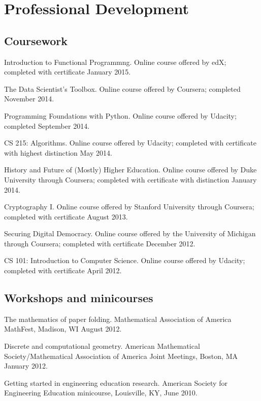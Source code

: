 \documentclass[letterpaper]{article}
\renewenvironment{itemize}{
  \begin{list}{}{
    \setlength{\leftmargin}{1.5em}
	\setlength{\itemsep}{0in}
  }
}{
  \end{list}
}
\begin{document}
\section*{Professional Development}

\subsection*{Coursework}
\begin{itemize}
	\item Introduction to Functional Programmng. Online course offered by edX; completed with certificate January 2015. 
	\item The Data Scientist's Toolbox. Online course offered by Coursera; completed November 2014. 
	\item Programming Foundations with Python. Online course offered by Udacity; completed September 2014. 
	\item CS 215: Algorithms. Online course offered by Udacity; completed with certificate with highest distinction May 2014.  
	\item History and Future of (Mostly) Higher Education. Online course offered by Duke University through Coursera; completed with certificate with distinction January 2014. 
	\item Cryptography I. Online course offered by Stanford University through Coursera; completed with certificate August 2013. 
	\item Securing Digital Democracy. Online course offered by the University of Michigan through Coursera; completed with certificate December 2012.
	\item CS 101: Introduction to Computer Science. Online course offered by Udacity; completed with certificate April 2012. 
\end{itemize}


\subsection*{Workshops and minicourses}

\begin{itemize}
	\item The mathematics of paper folding. Mathematical Association of America MathFest, Madison, WI August 2012. 
	\item Discrete and computational geometry. American Mathematical Society/Mathematical Association of America Joint Meetings, Boston, MA January 2012. 
	\item Getting started in engineering education research. American Society for Engineering Education minicourse, Louisville, KY, June 2010. 
\end{itemize}
\end{document}
